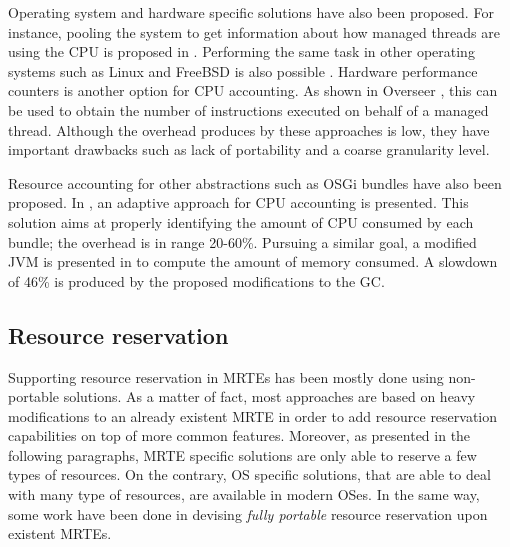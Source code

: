 Operating system and hardware specific solutions have also been proposed.
For instance, pooling the system to get information about how managed threads are using the CPU is proposed in \cite{czajkowski_jres:_1998}.
Performing the same task in other operating systems such as Linux and FreeBSD is also possible \cite{Soltesz:2007:COS:1272998.1273025, Kamp00jails:confining}.
Hardware performance counters is another option for CPU accounting.
As shown in Overseer \cite{DBLP:conf/pppj/PeternierBBP11}, this can be used to obtain the number of instructions executed on behalf of a managed thread.
Although the overhead produces by these approaches is low, they have important drawbacks such as lack of portability and a coarse granularity level.

Resource accounting for other abstractions such as OSGi bundles have also been proposed.
In \cite{Maurel:2012:AME:2304736.2304763}, an adaptive approach for CPU accounting is presented.
This solution aims at properly identifying the amount of CPU consumed by each bundle; the overhead is in range 20-60\%.
Pursuing a similar goal, a modified JVM is presented in \cite{Attouchi:2014:MMM:2602458.2602467} to compute the amount of memory consumed.
A slowdown of 46\% is produced by the proposed modifications to the GC.


\subsection{Resource reservation} \label{sec:resource-reservation-related}

Supporting resource reservation in MRTEs has been mostly done using non-portable solutions.
As a matter of fact, most approaches are based on heavy modifications to an already existent MRTE in order to add resource reservation capabilities on top of more common features.
Moreover, as presented in the following paragraphs, MRTE specific solutions are only able to reserve a few types of resources.
On the contrary, OS specific solutions, that are able to deal with many type of resources, are available in modern OSes.
In the same way, some work have been done in devising \textit{fully portable} resource reservation upon existent MRTEs.


